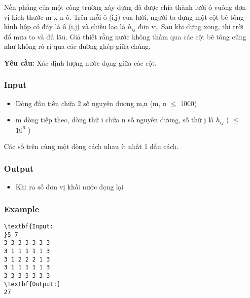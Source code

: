 

Nền phẳng của một công trường xây dựng đã được chia thành lưới ô vuông đơn vị kích thước m x n ô. Trên mỗi ô (i,j) của lưới, người ta dựng một cột bê tông hình hộp có đáy là ô (i,j) và chiều lao là $h_{ij}$ đơn vị. Sau khi dựng xong, thì trời đổ mưa to và đủ lâu. Giả thiết rằng nước không thấm qua các cột bê tông cũng như không rò rỉ qua các đường ghép giữa chúng.


\textbf{Yêu cầu:} Xác định lượng nước đọng giữa các cột.

\subsubsection{Input}
\begin{itemize}
	\item Dòng đầu tiên chứa 2 số nguyên dương m,n (m, n  $\le$ 1000)
	\item m dòng tiếp theo, dòng thứ i chứa n số nguyên dương, số thứ j là $h_{ij}$ ( $\le$ $10^{6}$ )
\end{itemize}

Các số trên cùng một dòng cách nhau ít nhất 1 dấu cách.

\subsubsection{Output}
\begin{itemize}
	\item Khi ra số đơn vị khối nước đọng lại
\end{itemize}

\subsubsection{Example}
\begin{verbatim}
\textbf{Input:
}5 7
3 3 3 3 3 3 3
3 1 1 1 1 1 3
3 1 2 2 2 1 3
3 1 1 1 1 1 3
3 3 3 3 3 3 3
\textbf{Output:}
27
\end{verbatim}
